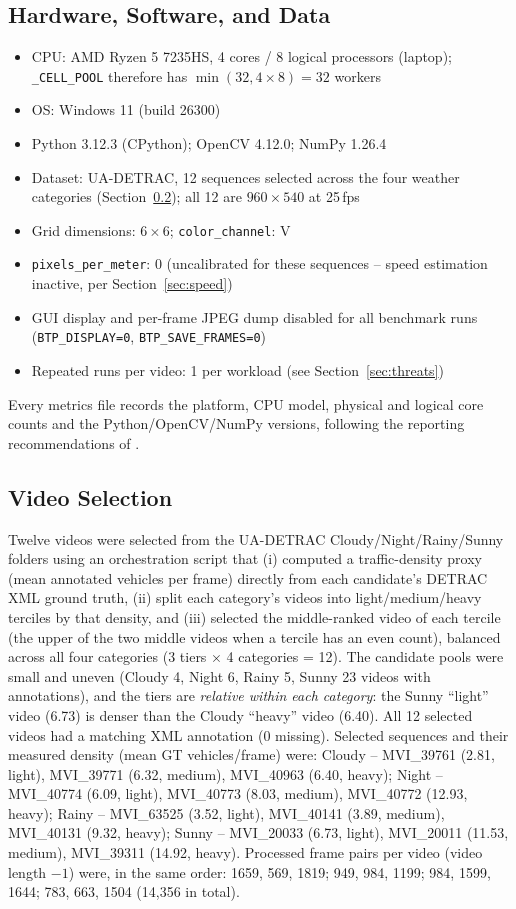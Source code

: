 \documentclass[conference]{IEEEtran}
\newcommand{\code}[1]{\texttt{#1}}
\begin{document}
\subsection{Hardware, Software, and Data}
\begin{itemize}
\item CPU: AMD Ryzen 5 7235HS, 4 cores / 8 logical processors (laptop);
\code{\_CELL\_POOL} therefore has $\min(32, 4\times8)=32$ workers
\item OS: Windows 11 (build 26300)
\item Python 3.12.3 (CPython); OpenCV 4.12.0; NumPy 1.26.4
\item Dataset: UA-DETRAC, 12 sequences selected across the four weather
categories (Section~\ref{sec:selection-detail}); all 12 are
$960\times540$ at 25\,fps
\item Grid dimensions: $6\times6$; \code{color\_channel}: V
\item \code{pixels\_per\_meter}: 0 (uncalibrated for these sequences --
speed estimation inactive, per Section~\ref{sec:speed})
\item GUI display and per-frame JPEG dump disabled for all benchmark runs
(\code{BTP\_DISPLAY=0}, \code{BTP\_SAVE\_FRAMES=0})
\item Repeated runs per video: 1 per workload (see
Section~\ref{sec:threats})
\end{itemize}
Every metrics file records the platform, CPU model, physical and logical
core counts and the Python/OpenCV/NumPy versions, following the
reporting recommendations of \cite{beyer2019}.

\subsection{Video Selection}
\label{sec:selection-detail}
Twelve videos were selected from the UA-DETRAC Cloudy/Night/Rainy/Sunny
folders using an orchestration script that (i) computed a traffic-density
proxy (mean annotated vehicles per frame) directly from each candidate's
DETRAC XML ground truth, (ii) split each category's videos into
light/medium/heavy terciles by that density, and (iii) selected the
middle-ranked video of each tercile (the upper of the two middle videos
when a tercile has an even count), balanced across all four categories
(3 tiers $\times$ 4 categories = 12). The candidate pools were small and
uneven (Cloudy 4, Night 6, Rainy 5, Sunny 23 videos with annotations),
and the tiers are \emph{relative within each category}: the Sunny
``light'' video (6.73) is denser than the Cloudy ``heavy'' video (6.40).
All 12 selected videos had a matching XML annotation (0 missing).
Selected sequences and their measured density (mean GT vehicles/frame)
were: Cloudy -- MVI\_39761 (2.81, light), MVI\_39771 (6.32, medium),
MVI\_40963 (6.40, heavy); Night -- MVI\_40774 (6.09, light), MVI\_40773
(8.03, medium), MVI\_40772 (12.93, heavy); Rainy -- MVI\_63525 (3.52,
light), MVI\_40141 (3.89, medium), MVI\_40131 (9.32, heavy); Sunny --
MVI\_20033 (6.73, light), MVI\_20011 (11.53, medium), MVI\_39311 (14.92,
heavy). Processed frame pairs per video (video length $-1$) were, in the
same order: 1659, 569, 1819; 949, 984, 1199; 984, 1599, 1644; 783, 663,
1504 (14{,}356 in total).
\end{document}
